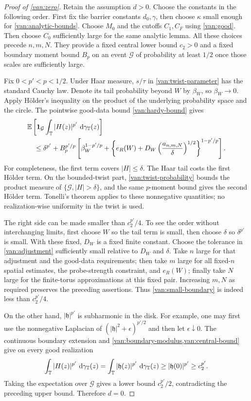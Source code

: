 \begin{proof}[Proof of \cref{van:zero}]
Retain the assumption $d>0$. Choose the constants in the following
order. First fix the barrier constants $d_0,\gamma$, then choose
$\kappa$ small enough for \cref{van:analytic-bounds}. Choose $M_0$
and the cutoffs $C_1,C_F$ using \cref{van:good}. Then choose $C_0$
sufficiently large for the same analytic lemma. All these choices
precede $n,m,N$. They provide a fixed central lower bound $c_2>0$
and a fixed boundary moment bound $B_p$ on an event $\mathcal G$
of probability at least $1/2$ once those scales are sufficiently large.

Fix $0<p'<p<1/2$. Under Haar measure, $s/\tau$ in
\cref{van:twist-parameter} has the standard Cauchy law. Denote its
tail probability beyond $W$ by $\beta_W$, so $\beta_W\to0$.
Apply H\"older's inequality on the product of the underlying
probability space and the circle. The pointwise good-data bound
\cref{van:hardy-bound} gives
\begin{align}
 &\mathbb E\left[\mathbf 1_{\mathcal G}
        \int_\mathbb T |H(z)|^{p'}\,\,\mathrm d\gamma_\mathbb T(z)\right]
 \label{van:small-boundary}\\
 &\quad\leq \delta^{p'}
   +B_p^{p'/p}\left[
       \beta_W^{1-p'/p}
       +\left\{e_R(W)+D_W
          \left(\frac{a_{n,m,N}}{\delta}\right)^{1/2}
        \right\}^{1-p'/p}\right].\notag
\end{align}
For completeness, the first term covers $|H|\leq\delta$. The
Haar tail costs the first H\"older term. On the bounded-twist part,
\cref{van:twist-probability} bounds the product measure of
$\{\mathcal G,|H|>\delta\}$, and the same $p$-moment bound gives
the second H\"older term. Tonelli's theorem applies to these
nonnegative quantities; no realization-wise uniformity in the twist
is used.

The right side can be made smaller than $c_2^{p'}/4$. To see the
order without interchanging limits, first choose $W$ so the tail term
is small, then choose $\delta$ so $\delta^{p'}$ is small. With these
fixed, $D_W$ is a fixed finite constant. Choose the tolerance in
\cref{van:adjustment} sufficiently small relative to $D_W$ and
$\delta$. Take $n$ large for that adjustment and the good-data
requirements; then take $m$ large for all fixed-$n$ spatial estimates,
the probe-strength constraint, and $e_R(W)$; finally take $N$ large
for the finite-torus approximations at this fixed pair. Increasing
$m,N$ as required preserves the preceding assertions. Thus
\cref{van:small-boundary} is indeed less than $c_2^{p'}/4$.

On the other hand, $|\mathfrak h|^{p'}$ is subharmonic in the disk.
For example, one may first use the nonnegative Laplacian of
$(|\mathfrak h|^2+\epsilon)^{p'/2}$ and then let
$\epsilon\downarrow0$. The continuous boundary extension and
\cref{van:boundary-modulus,van:central-bound} give on every good
realization
\[
 \int_\mathbb T|H(z)|^{p'}\,\,\mathrm d\gamma_\mathbb T(z)
 =\int_\mathbb T|\mathfrak h(z)|^{p'}\,\,\mathrm d\gamma_\mathbb T(z)
 \geq |\mathfrak h(0)|^{p'}\geq c_2^{p'}.
\]
Taking the expectation over $\mathcal G$ gives a lower bound
$c_2^{p'}/2$, contradicting the preceding upper bound. Therefore
$d=0$.
\end{proof}
